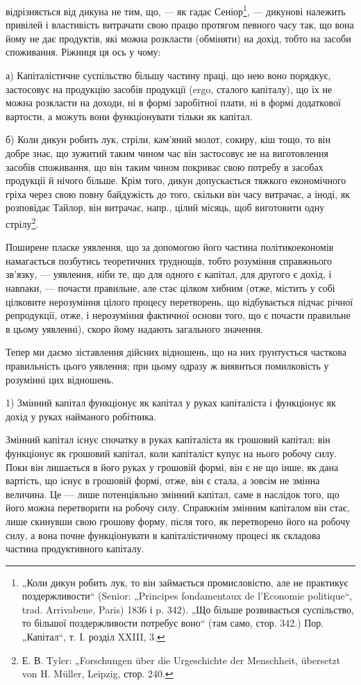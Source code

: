 відрізняється від дикуна не тим, що, — як гадає Сеніор\footnote{
„Коли дикун робить лук, то він займається промисловістю, але не практикує
поздержливости“ (Senior: „Principes fondamentaux de l’Economie politique“,
trad. Arrivabene, Paris) 1836 і p. 342). „Що більше розвивається суспільство, то
більшої поздержливости потребує воно“ (там само, стор. 342.) Пор. „Капітал“,
т. І. розділ XXIII, 3.
}, — дикунові
належить привілей і властивість витрачати свою працю протягом певного
часу так, що вона йому не дає продуктів, які можна розкласти (обміняти)
на дохід, тобто на засоби споживання. Ріжниця ця ось у чому:

а) Капіталістичне суспільство більшу частину праці, що нею воно
порядкує, застосовує на продукцію засобів продукції (ergo, сталого
капіталу), що їх не можна розкласти на доходи, ні в формі заробітної
плати, ні в формі додаткової вартости, а можуть вони функціонувати
тільки як капітал.

б) Коли дикун робить лук, стріли, кам’яний молот, сокиру, кіш тощо,
то він добре знає, що зужитий таким чином час він застосовує не на
виготовлення засобів споживання, що він таким чином покриває свою
потребу в засобах продукції й нічого більше. Крім того, дикун допускається
тяжкого економічного гріха через свою повну байдужість до того,
скільки він часу витрачає, а іноді, як розповідає Тайлор, він витрачає,
напр., цілий місяць, щоб виготовити одну стрілу\footnote{
Е. В. Tyler: „Forschungen über die Urgeschichte der Menschheit, übersetzt
von H. Müller, Leipzig, стор. 240.
}.

Поширене пласке уявлення, що за допомогою його частина політикоекономів
намагається позбутись теоретичних труднощів, тобто розуміння
справжнього зв’язку, — уявлення, ніби те, що для одного є капітал, для
другого є дохід, і навпаки, — почасти правильне, але стає цілком хибним
(отже, містить у собі цілковите нерозуміння цілого процесу перетворень,
що відбувається підчас річної репродукції, отже, і нерозуміння фактичної
основи того, що є почасти правильне в цьому уявленні), скоро йому
надають загального значення.

Тепер ми даємо зіставлення дійсних відношень, що на них ґрунтується
часткова правильність цього уявлення; при цьому одразу ж виявиться
помилковість у розумінні цих відношень.

1) Змінний капітал функціонує як капітал у руках капіталіста і функціонує
як дохід у руках найманого робітника.

Змінний капітал існує спочатку в руках капіталіста як грошовий
капітал; він функціонує як грошовий капітал, коли капіталіст
купує на нього робочу силу. Поки він лишається в його руках у грошовій
формі, він є не що інше, як дана вартість, що існує в грошовій
формі, отже, він є стала, а зовсім не змінна величина. Це — лише потенціяльно
змінний капітал, саме в наслідок того, що його можна перетворити
на робочу силу. Справжнім змінним капіталом він стає, лише скинувши
свою грошову форму, після того, як перетворено його на робочу
силу, а вона почне функціонувати в капіталістичному процесі як складова
частина продуктивного капіталу.